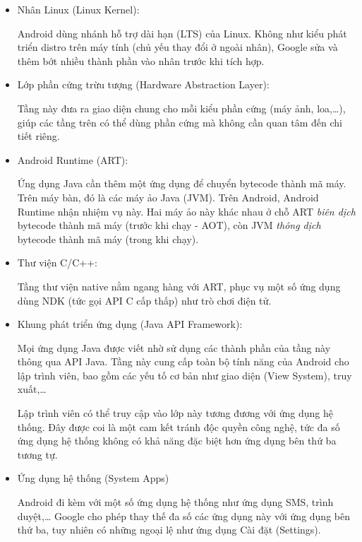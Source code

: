 \documentclass[../../thesis]{subfiles}
\begin{document}
\begin{itemize}
    \item
        Nhân Linux (Linux Kernel):

        Android dùng nhánh hỗ trợ dài hạn (LTS) của Linux. Không như kiểu phát
        triển distro trên máy tính (chủ yếu thay đổi ở ngoài nhân), Google sửa
        và thêm bớt nhiều thành phần vào nhân trước khi tích hợp.
    \item
        Lớp phần cứng trừu tượng (Hardware Abstraction Layer):

        Tầng này đưa ra giao diện chung cho mỗi kiểu phần cứng (máy ảnh,
        loa,\ldots), giúp các tầng trên có thể dùng phần cứng mà không cần quan
        tâm đến chi tiết riêng.
    \item
        Android Runtime (ART):

        Ứng dụng Java cần thêm một ứng dụng để chuyển bytecode thành mã máy.
        Trên máy bàn, đó là các máy ảo Java (JVM). Trên Android, Android Runtime
        nhận nhiệm vụ này. Hai máy ảo này khác nhau ở chỗ ART \emph{biên dịch}
        bytecode thành mã máy (trước khi chạy - AOT), còn JVM \emph{thông dịch}
        bytecode thành mã máy (trong khi chạy).
\end{itemize}

\begin{itemize}[resume, before = \vspace*{-\dimexpr\topsep+\partopsep\relax}]
    \item
        Thư viện C/C++:

        Tầng thư viện native nằm ngang hàng với ART, phục vụ một số ứng dụng
        dùng NDK (tức gọi API C cấp thấp) như trò chơi điện tử.
    \item
        Khung phát triển ứng dụng (Java API Framework):

        Mọi ứng dụng Java được viết nhờ sử dụng các thành phần của tầng này
        thông qua API Java. Tầng này cung cấp toàn bộ tính năng của Android cho
        lập trình viên, bao gồm các yếu tố cơ bản như giao diện (View System),
        truy xuất,\ldots

        Lập trình viên có thể truy cập vào lớp này tương đương với ứng dụng hệ
        thống. Đây được coi là một cam kết tránh độc quyền công nghệ, tức đa số
        ứng dụng hệ thống không có khả năng đặc biệt hơn ứng dụng bên thứ ba
        tương tự.
    \item
        Ứng dụng hệ thống (System Apps)

        Android đi kèm với một số ứng dụng hệ thống như ứng dụng SMS, trình
        duyệt,\ldots{} Google cho phép thay thế đa số các ứng dụng này với ứng
        dụng bên thứ ba, tuy nhiên có những ngoại lệ như ứng dụng Cài đặt
        (Settings).
\end{itemize}
\end{document}

